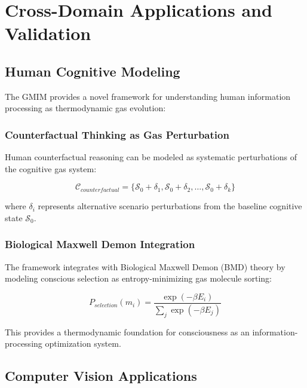 \documentclass[11pt,a4paper]{article}
\begin{document}
\section{Cross-Domain Applications and Validation}

\subsection{Human Cognitive Modeling}

The GMIM provides a novel framework for understanding human information processing as thermodynamic gas evolution:

\subsubsection{Counterfactual Thinking as Gas Perturbation}

Human counterfactual reasoning \citep{byrne2005rational, roese1997counterfactual} can be modeled as systematic perturbations of the cognitive gas system:

\begin{equation}
\mathcal{C}_{counterfactual} = \{\mathcal{S}_0 + \delta_1, \mathcal{S}_0 + \delta_2, \ldots, \mathcal{S}_0 + \delta_k\}
\end{equation}

where $\delta_i$ represents alternative scenario perturbations from the baseline cognitive state $\mathcal{S}_0$.

\subsubsection{Biological Maxwell Demon Integration}

The framework integrates with Biological Maxwell Demon (BMD) theory \citep{bennett1987demons, sagawa2012thermodynamics} by modeling conscious selection as entropy-minimizing gas molecule sorting:

\begin{equation}
P_{selection}(m_i) = \frac{\exp(-\beta E_i)}{\sum_j \exp(-\beta E_j)}
\end{equation}

This provides a thermodynamic foundation for consciousness as an information-processing optimization system.

\subsection{Computer Vision Applications}
\end{document}

